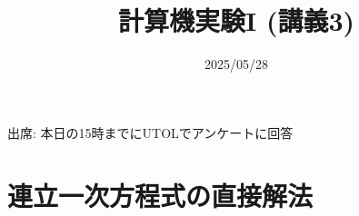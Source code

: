 \documentclass[10pt,dvipdfmx]{beamer}
\title{計算機実験I (講義3)}
\date{2025/05/28}
\begin{document}
\begin{frame}
  \titlepage
  \tableofcontents
  出席: 本日の15時までにUTOLでアンケートに回答
\end{frame}





\section{連立一次方程式の直接解法}









%
%


%





















\section{}

\end{document}
